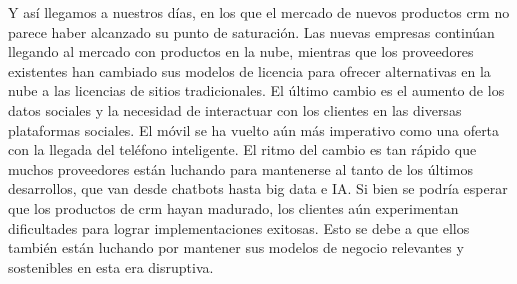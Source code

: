 Y así llegamos a nuestros días, en los que el mercado de nuevos productos \acrshort{crm} no parece haber alcanzado su punto de saturación. Las nuevas empresas continúan llegando al mercado con productos en la nube, mientras que los proveedores existentes han cambiado sus modelos de licencia para ofrecer alternativas en la nube a las licencias de sitios tradicionales. El último cambio es el aumento de los datos sociales y la necesidad de interactuar con los clientes en las diversas plataformas sociales. El móvil se ha vuelto aún más imperativo como una oferta con la llegada del teléfono inteligente. El ritmo del cambio es tan rápido que muchos proveedores están luchando para mantenerse al tanto de los últimos desarrollos, que van desde chatbots hasta big data e IA. Si bien se podría esperar que los productos de \acrshort{crm} hayan madurado, los clientes aún experimentan dificultades para lograr implementaciones exitosas. Esto se debe a que ellos también están luchando por mantener sus modelos de negocio relevantes y sostenibles en esta era disruptiva.
